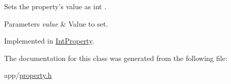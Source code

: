 Sets the property's value as int . 


\begin{DoxyParams}{Parameters}
{\em value} & Value to set. \\
\hline
\end{DoxyParams}


Implemented in \hyperlink{class_int_property_a9c3b7ced3c8b7d8fbb9f739449e5622e}{Int\-Property}.



The documentation for this class was generated from the following file\-:\begin{DoxyCompactItemize}
\item 
app/\hyperlink{property_8h}{property.\-h}\end{DoxyCompactItemize}
